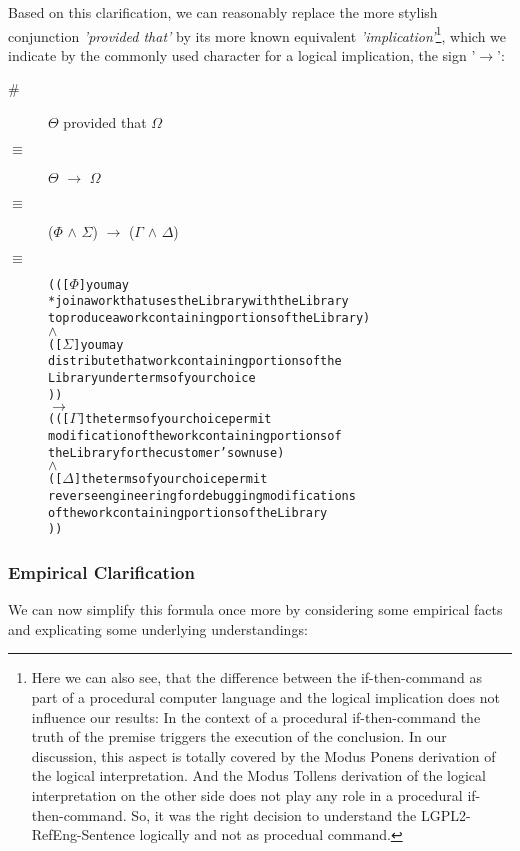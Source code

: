 Based on this clarification, we can reasonably replace the more stylish
conjunction \emph{'provided that'} by its more known equivalent
\emph{'implication'}\footnote{Here we can also see, that the difference between
the if-then-command as part of a procedural computer language and the logical
implication does not influence our results: In the context of a procedural
if-then-command the truth of the premise triggers the execution of the
conclusion. In our discussion, this aspect is totally covered by the Modus
Ponens derivation of the logical interpretation. And the Modus Tollens
derivation of the logical interpretation on the other side does not play any
role in a procedural if-then-command. So, it was the right decision to
understand the LGPL2-RefEng-Sentence logically and not as procedual command.},
which we indicate by the commonly used character for a logical implication, the
sign '\emph{$\rightarrow$}':

\begin{description}
  \item[\#]  $\Theta$ provided that $\Omega$
  \item[$\equiv$] $\Theta$ $\rightarrow$ $\Omega$
  \item[$\equiv$] ($\Phi$ $\wedge$ $\Sigma$) $\rightarrow$ ($\Gamma$ $\wedge$
  $\Delta$)
  \item[$\equiv$]
\begin{alltt}   
  ( ( [\(\Phi\)] you may 
       *join a work that uses the Library with the Library
       to produce a work containing portions of the Library )
  \(\wedge\)
  ( [\(\Sigma\)] you may 
        distribute that work containing portions of the 
        Library under terms of your choice 
) )
\(\rightarrow\)
( ( [\(\Gamma\)] the terms of your choice permit 
        modification of the work containing portions of 
        the Library for the customer's own use )
  \(\wedge\)
  ( [\(\Delta\)] the terms of your choice permit
        reverse engineering for debugging modifications 
        of the work containing portions of the Library   
) )
\end{alltt}
\end{description}

\subsubsection{Empirical Clarification}

We can now simplify this formula once more by considering some empirical facts
and explicating some underlying understandings:


